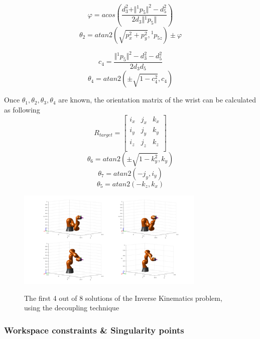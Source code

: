 \begin{equation}
φ = acos \left( \frac{d_3^2 + \Vert{}^1p_{5}\Vert ^2 - d_5^2}{2d_3 \Vert{}^1p_{5}\Vert} \right)
\end{equation}
\begin{equation}
θ_2 = atan2 \left( \sqrt{p_x^2 + p_y^2}, {}^1p_{5z} \right) \pm φ
\end{equation}

\[ c_4 = \frac{ \Vert{}^1p_{5}\Vert ^2 - d_3^2 - d_5^2 }{2d_3d_5} \]
\begin{equation}
θ_4 = atan2 \left( \pm \sqrt{1 - c_4^2}, c_4 \right)
\end{equation}

Once $θ_1,θ_2,θ_3,θ_4$ are known, the orientation matrix of the wrist can be calculated as following
\[
R_{target} = 
\begin{bmatrix}
i_x & j_x & k_x\\
i_y & j_y & k_y\\
i_z & j_z & k_z\\
\end{bmatrix}
\]
\begin{equation}
θ_6 = atan2 \left( \pm \sqrt{1-k_y^2}, k_y \right)
\end{equation}
\[
θ_7 = atan2 \left( -j_y, i_y \right)
\]
\[
θ_5 = atan2 \left( - k_z, k_x \right)
\]

\begin{center}
\begin{figure}[H]
\centering
\includegraphics[width=0.8\textwidth]{images/ik-4-solutions.png}\\
\caption{The first 4 out of 8 solutions of the Inverse Kinematics problem, using the decoupling technique}
\end{figure}
\end{center}


\subsubsection{Workspace constraints \& Singularity points}

